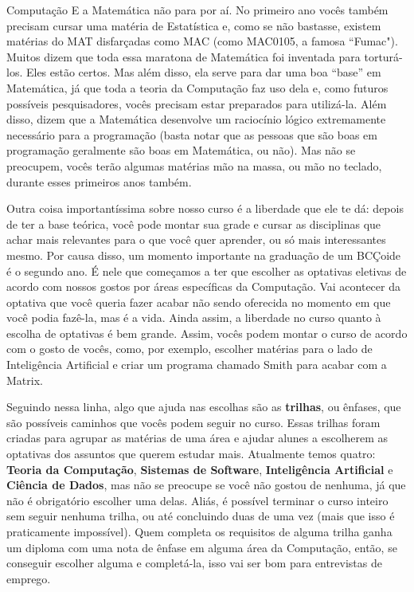 \begin{subsecao}{Computação}
E a Matemática não para por aí. No primeiro ano vocês também precisam cursar
uma matéria de Estatística e, como se não bastasse, existem matérias do MAT
disfarçadas como MAC (como MAC0105, a famosa ``Fumac"). 
Muitos dizem que toda essa maratona de Matemática foi inventada para torturá-los. 
Eles estão certos. Mas além disso, ela serve para dar uma boa ``base'' em Matemática,
já que toda a teoria da Computação faz uso dela e, como futuros possíveis
pesquisadores, vocês precisam estar preparados para utilizá-la. Além disso, dizem
que a Matemática desenvolve um raciocínio lógico extremamente necessário para a
programação (basta notar que as pessoas que são boas em programação geralmente
são boas em Matemática, ou não). Mas não se preocupem, vocês terão algumas
matérias mão na massa, ou mão no teclado, durante esses primeiros anos também.

Outra coisa importantíssima sobre nosso curso é a liberdade que ele te dá:
depois de ter a base teórica, você pode montar sua grade e cursar as
disciplinas que achar mais relevantes para o que você quer aprender, ou só
mais interessantes mesmo. Por causa disso, um momento importante na graduação
de um BCÇoide é o segundo ano. É nele que começamos a ter que escolher as
optativas eletivas de acordo com nossos gostos por áreas específicas da
Computação. Vai acontecer da optativa que você queria fazer acabar não sendo
oferecida no momento em que você podia fazê-la, mas é a vida. Ainda assim, a
liberdade no curso quanto à escolha de optativas é bem grande. Assim, vocês
podem montar o curso de acordo com o gosto de vocês, como, por exemplo, escolher
matérias para o lado de Inteligência Artificial e criar um programa chamado
Smith para acabar com a Matrix.

Seguindo nessa linha, algo que ajuda nas escolhas são as \textbf{trilhas}, ou
ênfases, que são possíveis caminhos que vocês podem seguir no curso. Essas
trilhas foram criadas para agrupar as matérias de uma área e ajudar alunes a
escolherem as optativas dos assuntos que querem estudar mais. Atualmente temos
quatro: \textbf{Teoria da Computação}, \textbf{Sistemas de Software}, 
\textbf{Inteligência Artificial} e \textbf{Ciência de Dados}, mas não se preocupe 
se você não gostou de nenhuma, já que não é obrigatório escolher uma delas. Aliás, é 
possível terminar o curso inteiro sem seguir nenhuma trilha, ou até concluindo duas 
de uma vez (mais que isso é praticamente impossível). Quem completa os requisitos 
de alguma trilha ganha um diploma com uma nota de ênfase em alguma área da Computação,
então, se conseguir escolher alguma e completá-la, isso vai ser bom para entrevistas
de emprego.


\end{subsecao}
